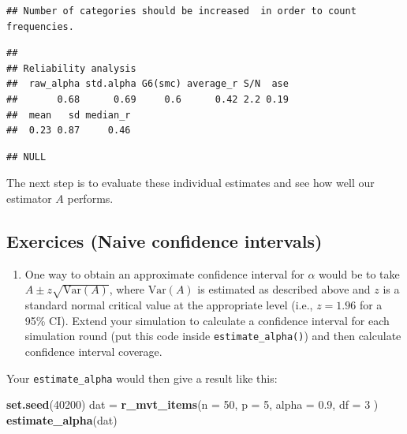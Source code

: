 \documentclass[
]{book}
\newenvironment{Shaded}{\begin{snugshade}}{\end{snugshade}}
\newcommand{\AttributeTok}[1]{\textcolor[rgb]{0.13,0.29,0.53}{#1}}
\newcommand{\DecValTok}[1]{\textcolor[rgb]{0.00,0.00,0.81}{#1}}
\newcommand{\FloatTok}[1]{\textcolor[rgb]{0.00,0.00,0.81}{#1}}
\newcommand{\FunctionTok}[1]{\textcolor[rgb]{0.13,0.29,0.53}{\textbf{#1}}}
\newcommand{\NormalTok}[1]{#1}
\newcommand{\OtherTok}[1]{\textcolor[rgb]{0.56,0.35,0.01}{#1}}
\providecommand{\tightlist}{%
  \setlength{\itemsep}{0pt}\setlength{\parskip}{0pt}}
\begin{document}
\begin{verbatim}
## Number of categories should be increased  in order to count frequencies.
\end{verbatim}

\begin{verbatim}
## 
## Reliability analysis   
##  raw_alpha std.alpha G6(smc) average_r S/N  ase
##       0.68      0.69     0.6      0.42 2.2 0.19
##  mean   sd median_r
##  0.23 0.87     0.46
\end{verbatim}

\begin{verbatim}
## NULL
\end{verbatim}

The next step is to evaluate these individual estimates and see how well our estimator \(A\) performs.

\subsection{Exercices (Naive confidence intervals)}\label{exercices-naive-confidence-intervals}

\begin{enumerate}
\def\labelenumi{\arabic{enumi}.}
\tightlist
\item
  One way to obtain an approximate confidence interval for \(\alpha\) would be to take \(A \pm z \sqrt{\text{Var}(A)}\), where \(\text{Var}(A)\) is estimated as described above and \(z\) is a standard normal critical value at the appropriate level (i.e., \(z = 1.96\) for a 95\% CI).
  Extend your simulation to calculate a confidence interval for each simulation round (put this code inside \texttt{estimate\_alpha()}) and then calculate confidence interval coverage.
\end{enumerate}

Your \texttt{estimate\_alpha} would then give a result like this:

\begin{Shaded}
\begin{Highlighting}[]
\FunctionTok{set.seed}\NormalTok{(}\DecValTok{40200}\NormalTok{)}
\NormalTok{dat }\OtherTok{=} \FunctionTok{r\_mvt\_items}\NormalTok{(}\AttributeTok{n =} \DecValTok{50}\NormalTok{, }\AttributeTok{p =} \DecValTok{5}\NormalTok{, }\AttributeTok{alpha =} \FloatTok{0.9}\NormalTok{, }\AttributeTok{df =} \DecValTok{3}\NormalTok{ )}
\FunctionTok{estimate\_alpha}\NormalTok{(dat)}
\end{Highlighting}
\end{Shaded}
\end{document}
